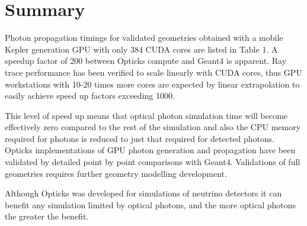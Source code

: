 \documentclass[a4paper]{jpconf}
\begin{document}
\section{Summary}
%
%
Photon propagation timings for validated geometries 
obtained with a mobile Kepler generation GPU with only 384 CUDA cores are listed in Table 1.
A speedup factor of 200 between Opticks compute and Geant4 is apparent.
Ray trace performance has been verified to scale linearly with CUDA cores, thus 
GPU workstations with 10-20 times more cores are expected by linear extrapolation 
to easily achieve speed up factors exceeding 1000.  

This level of speed up means that optical photon simulation time
will become effectively zero compared to the rest of the simulation and 
also the CPU memory required for photons is reduced to just that required for detected photons.  
Opticks implementations of GPU photon generation and propagation have been 
validated by detailed point by point comparisons with Geant4.  Validations
of full geometries requires further geometry modelling development.

Although Opticks was developed for simulations of neutrino detectors
it can benefit any simulation limited by optical photons, and
the more optical photons the greater the benefit.

\end{document}
